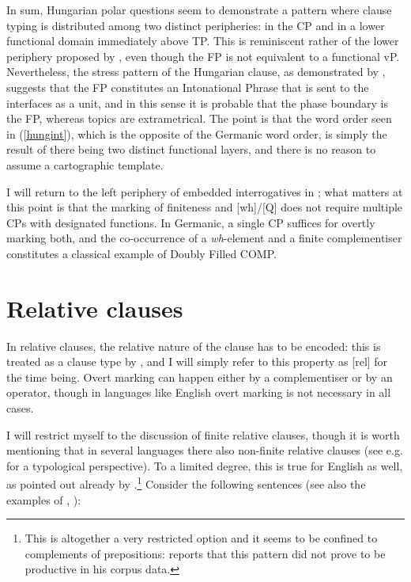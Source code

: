 \begin{sloppypar}
In sum, Hungarian polar questions seem to demonstrate a pattern where clause typing is distributed among two distinct peripheries: in the CP and in a lower functional domain immediately above TP. This is reminiscent rather of the lower periphery proposed by \citet{poletto2006}, even though the FP is not equivalent to a functional vP. Nevertheless, the stress pattern of the Hungarian clause, as demonstrated by \citet{szendroi2001diss}, suggests that the FP constitutes an Intonational Phrase that is sent to the interfaces as a unit, and in this sense it is probable that the phase boundary is the FP, whereas topics are extrametrical. The point is that the word order seen in (\ref{hungint}), which is the opposite of the Germanic word order, is simply the result of there being two distinct functional layers, and there is no reason to assume a cartographic template.
\end{sloppypar}

I will return to the left periphery of embedded interrogatives in ; what matters at this point is that the marking of finiteness and [wh]/[Q] does not require multiple CPs with designated functions. In Germanic, a single CP suffices for overtly marking both, and the co-occurrence of a \textit{wh}-element and a finite complementiser constitutes a classical example of Doubly Filled COMP.

\section{Relative clauses} \label{sec:2relative}
In relative clauses, the relative nature of the clause has to be encoded: this is treated as a clause type by \citet{rizzi1997}, and I will simply refer to this property as [rel] for the time being. Overt marking can happen either by a complementiser or by an operator, though in languages like English overt marking is not necessary in all cases. 

I will restrict myself to the discussion of finite relative clauses, though it is worth mentioning that in several languages there also non-finite relative clauses (see e.g. \citealt{ackermannikolaeva2013} for a typological perspective). To a limited degree, this is true for English as well, as pointed out already by \citet{chomsky1977}.\footnote{This is altogether a very restricted option and it seems to be confined to complements of prepositions: \citet[13]{radford2019} reports that this pattern did not prove to be productive in his corpus data.} Consider the following sentences (see also the examples of \citealt[161--162]{law2000}, \citealt[199]{aarts2011}):

